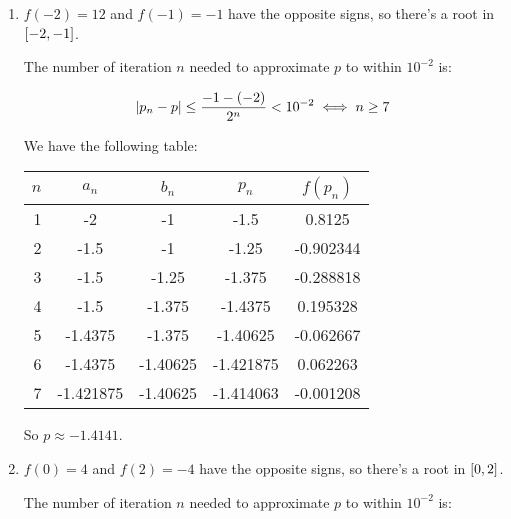\documentclass[../../Assignments.tex]{subfiles}
\begin{document}
\begin{solution}
    \begin{enumerate}[label=(\alph*)]
        \item \(f(-2) = 12\) and \(f(-1) = -1\) have the opposite signs, so
            there's a root in \(\interval{-2}{-1}\).

            The number of iteration \(n\) needed to approximate \(p\) to within
            \(10^{-2}\) is:

            \[\abs{p_n - p} \leq \frac{-1 - (-2)}{2^n} < 10^{-2} \iff n \geq 7\]

            We have the following table:

            \begin{table}[hbt!]
                \centering
                \begin{tabular}{r S[table-format=-1.5] S[table-format=-1.5] S[table-format=-1.6] S[table-format=-1.6]}
                    \toprule
                    \(n\)  &  {\(a_n\)}  &  {\(b_n\)}  &  {\(p_n\)}  &  {\(f(p_n)\)}  \\
                      &  -2         &  -1         &  -1.5       &   0.8125       \\
                        2  &  -1.5       &  -1         &  -1.25      &  -0.902344     \\
                        3  &  -1.5       &  -1.25      &  -1.375     &  -0.288818     \\
                        4  &  -1.5       &  -1.375     &  -1.4375    &   0.195328     \\
                        5  &  -1.4375    &  -1.375     &  -1.40625   &  -0.062667     \\
                        6  &  -1.4375    &  -1.40625   &  -1.421875  &   0.062263     \\
                        7  &  -1.421875  &  -1.40625   &  -1.414063  &  -0.001208     \\
                    \bottomrule
                \end{tabular}
            \end{table}

            So \(p \approx \num{-1.4141}\).

        \item \(f(0) = 4\) and \(f(2) = -4\) have the opposite signs, so there's
            a root in \(\interval{0}{2}\).

            The number of iteration \(n\) needed to approximate \(p\) to within
            \(10^{-2}\) is:


\end{enumerate}
\end{solution}
\end{document}
